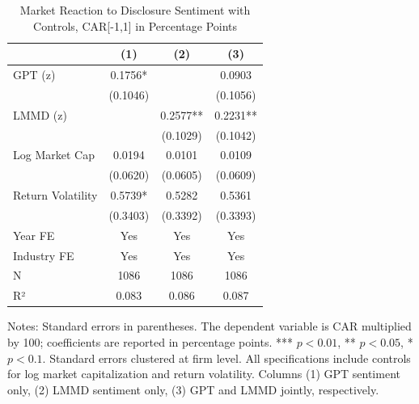 \begin{table}[htbp]
\centering
\caption{Market Reaction to Disclosure Sentiment with Controls, CAR[-1,1] in Percentage Points}
\label{tab:car_sentiment_controls}
\begin{tabular}{lccc}
\toprule
 & (1) & (2) & (3) \\
\midrule
GPT (z) & 0.1756* &  & 0.0903 \\
  & (0.1046) &  & (0.1056) \\
LMMD (z) &  & 0.2577** & 0.2231** \\
  &  & (0.1029) & (0.1042) \\
Log Market Cap & 0.0194 & 0.0101 & 0.0109 \\
  & (0.0620) & (0.0605) & (0.0609) \\
Return Volatility & 0.5739* & 0.5282 & 0.5361 \\
  & (0.3403) & (0.3392) & (0.3393) \\
\midrule
Year FE & Yes & Yes & Yes \\
Industry FE & Yes & Yes & Yes \\
N & 1086 & 1086 & 1086 \\
R² & 0.083 & 0.086 & 0.087 \\
\bottomrule
\end{tabular}\begin{flushleft}
\footnotesize Notes: Standard errors in parentheses. The dependent variable is CAR multiplied by 100; coefficients are reported in percentage points. *** $p<0.01$, ** $p<0.05$, * $p<0.1$. Standard errors clustered at firm level. All specifications include controls for log market capitalization and return volatility. Columns (1) GPT sentiment only, (2) LMMD sentiment only, (3) GPT and LMMD jointly, respectively.
\end{flushleft}
\end{table}